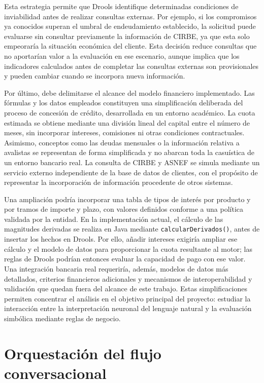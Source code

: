 \documentclass[12pt,a4paper]{report}
\begin{document}
Esta estrategia permite que Drools identifique determinadas condiciones de inviabilidad antes de realizar consultas externas. Por ejemplo, si los compromisos ya conocidos superan el umbral de endeudamiento establecido, la solicitud puede evaluarse sin consultar previamente la información de CIRBE, ya que esta solo empeoraría la situación económica del cliente. Esta decisión reduce consultas que no aportarían valor a la evaluación en ese escenario, aunque implica que los indicadores calculados antes de completar las consultas externas son provisionales y pueden cambiar cuando se incorpora nueva información.

Por último, debe delimitarse el alcance del modelo financiero implementado. Las fórmulas y los datos empleados constituyen una simplificación deliberada del proceso de concesión de crédito, desarrollada en un entorno académico. La cuota estimada se obtiene mediante una división lineal del capital entre el número de meses, sin incorporar intereses, comisiones ni otras condiciones contractuales. Asimismo, conceptos como las deudas mensuales o la información relativa a avalistas se representan de forma simplificada y no abarcan toda la casuística de un entorno bancario real. La consulta de CIRBE y ASNEF se simula mediante un servicio externo independiente de la base de datos de clientes, con el propósito de representar la incorporación de información procedente de otros sistemas.

Una ampliación podría incorporar una tabla de tipos de interés por producto y por tramos de importe y plazo, con valores definidos conforme a una política validada por la entidad. En la implementación actual, el cálculo de las magnitudes derivadas se realiza en Java mediante \texttt{calcularDerivados()}, antes de insertar los hechos en Drools. Por ello, añadir intereses exigiría ampliar ese cálculo y el modelo de datos para proporcionar la cuota resultante al motor; las reglas de Drools podrían entonces evaluar la capacidad de pago con ese valor. Una integración bancaria real requeriría, además, modelos de datos más detallados, criterios financieros adicionales y mecanismos de interoperabilidad y validación que quedan fuera del alcance de este trabajo. Estas simplificaciones permiten concentrar el análisis en el objetivo principal del proyecto: estudiar la interacción entre la interpretación neuronal del lenguaje natural y la evaluación simbólica mediante reglas de negocio.

\section{Orquestación del flujo conversacional}
\end{document}
